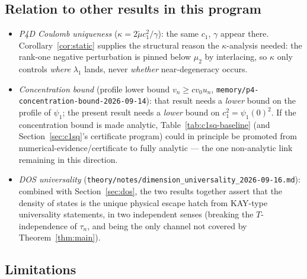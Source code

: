 \documentclass[11pt]{article}
\begin{document}
\subsection{Relation to other results in this program}

\begin{itemize}
\item \emph{P4D Coulomb uniqueness} ($\kappa=2\tilde\mu c_1^2/\gamma$): the
same $c_1$, $\gamma$ appear there. Corollary~\ref{cor:static} supplies the
structural reason the $\kappa$-analysis needed: the rank-one negative
perturbation is pinned below $\mu_2$ by interlacing, so $\kappa$ only
controls \emph{where} $\lambda_1$ lands, never \emph{whether} near-degeneracy
occurs.
\item \emph{Concentration bound} (profile lower bound $v_n\ge cv_0u_n$,
\texttt{memory/p4-concentration-bound-2026-09-14}): that result needs a
\emph{lower} bound on the profile of $\psi_1$; the present result needs a
\emph{lower} bound on $c_1^2=\psi_1(0)^2$. If the concentration bound is made
analytic, Table~\ref{tab:c1sq-baseline} (and Section~\ref{sec:c1sq}'s
certificate program) could in principle be promoted from
numerical-evidence/certificate to fully analytic --- the one non-analytic
link remaining in this direction.
\item \emph{DOS universality} (\texttt{theory/notes/dimension\_universality\_2026-09-16.md}):
combined with Section~\ref{sec:dos}, the two results together assert that
the density of states is the unique physical escape hatch from KAY-type
universality statements, in two independent senses (breaking the
$T$-independence of $\tau_n$, and being the only channel not covered by
Theorem~\ref{thm:main}).
\end{itemize}

\subsection{Limitations}
\end{document}
